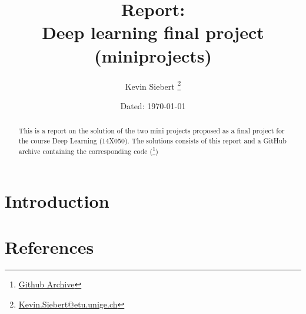 \documentclass[11pt,english]{article}
\title{\textbf{Report: \\ Deep learning final project (miniprojects)}}
\author{Kevin Siebert%
    \thanks{\href{mailto:Kevin.Siebert@etu.unige.ch}{Kevin.Siebert@etu.unige.ch}}}
\affil{Department of Informatics, Faculty of Science, \\ University of Geneva}
\date{Dated: \today}
\begin{document}
    \maketitle
    
    \begin{abstract}
        This is a report on the solution of the two mini projects proposed as a final project for the course Deep Learning (14X050). The solutions consists of this report and a GitHub archive containing the corresponding code (\thanks{\href{https://github.com/I-am-Rudi/DL_FinalProject}{Github Archive}})
    \end{abstract}
    
    \begin{multicols}{2}
    \section{Introduction} \label{sec:Introduction}
    
    
    \section*{References}
\end{multicols}
\end{document}

